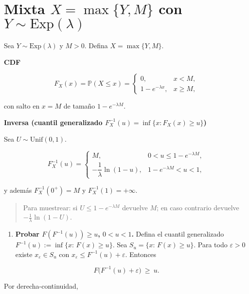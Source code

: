 \documentclass[11pt]{article}
\providecommand{\tightlist}{%
      \setlength{\itemsep}{0pt}\setlength{\parskip}{0pt}}
\begin{document}
    \hypertarget{mixta-xmaxym-con-ysimmathrmexplambda}{%
\section{\texorpdfstring{Mixta \(X=\max\{Y,M\}\) con
\(Y\sim\mathrm{Exp}(\lambda)\)}{Mixta X=\textbackslash max\textbackslash\{Y,M\textbackslash\} con Y\textbackslash sim\textbackslash mathrm\{Exp\}(\textbackslash lambda)}}\label{mixta-xmaxym-con-ysimmathrmexplambda}}

    Sea \textbf{\(Y\sim\mathrm{Exp}(\lambda)\)} y \(M>0\). Defina
\(X=\max\{Y,M\}\).

\textbf{CDF}

\[
F_X(x)=\mathbb P(X\le x)=
\begin{cases}
0,& x<M,\\[4pt]
1-e^{-\lambda x},& x\ge M,
\end{cases}
\]

con salto en \(x=M\) de tamaño \(1-e^{-\lambda M}\).

\textbf{Inversa (cuantil generalizado
\(F_X^{-1}(u)=\inf\{x:F_X(x)\ge u\}\))}

Sea \textbf{\(U\sim\mathrm{Unif}(0,1)\)}.

\[
F_X^{-1}(u)=
\begin{cases}
M,& 0<u\le 1-e^{-\lambda M},\\[6pt]
-\dfrac{1}{\lambda}\ln(1-u),& 1-e^{-\lambda M}<u<1,
\end{cases}
\]

y además \(F_X^{-1}(0^+)=M\) y \(F_X^{-1}(1)=+\infty\).

\begin{quote}
Para muestrear: si \(U\le 1-e^{-\lambda M}\) devuelve \(M\); en caso
contrario devuelve \(-\frac1\lambda\ln(1-U)\).
\end{quote}

    \begin{enumerate}
\def\labelenumi{\alph{enumi})}
\setcounter{enumi}{2}
\tightlist
\item
  \textbf{Probar \(F(F^{-1}(u))\ge u\), \(0<u<1\).} Defina el cuantil
  generalizado \(F^{-1}(u):=\inf\{x:\,F(x)\ge u\}\). Sea
  \(S_u=\{x:\,F(x)\ge u\}\). Para todo \(\varepsilon>0\) existe
  \(x_\varepsilon\in S_u\) con
  \(x_\varepsilon\le F^{-1}(u)+\varepsilon\). Entonces
\end{enumerate}

\[
F\big(F^{-1}(u)+\varepsilon\big)\ \ge\ u.
\]

Por derecha-continuidad,
\end{document}
